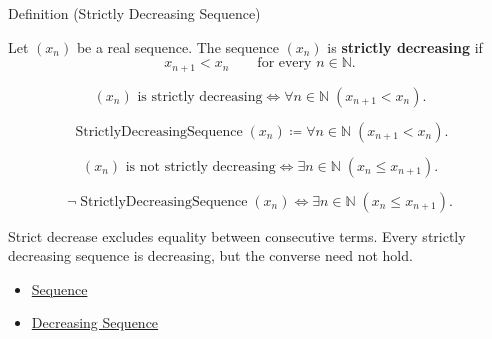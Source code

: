 
\begin{definitionbox}{Definition (Strictly Decreasing Sequence)}
\begin{definition}
\label{def:strictly-decreasing-sequence}
Let $(x_n)$ be a real sequence. The sequence $(x_n)$ is
\textbf{strictly decreasing} if
\[
  x_{n+1} < x_n
  \qquad
  \text{for every } n\in\mathbb{N}.
\]
\end{definition}
\end{definitionbox}

\begin{remark*}
\[
(x_n)\text{ is strictly decreasing}
\Longleftrightarrow
\forall n\in\mathbb{N}\;(x_{n+1}<x_n).
\]
\end{remark*}

\begin{remark*}
\[
\operatorname{StrictlyDecreasingSequence}(x_n)
\coloneqq
\forall n\in\mathbb{N}\;(x_{n+1}<x_n).
\]
\end{remark*}

\begin{remark*}
\[
(x_n)\text{ is not strictly decreasing}
\Longleftrightarrow
\exists n\in\mathbb{N}\;(x_n\le x_{n+1}).
\]
\end{remark*}

\begin{remark*}
\[
\neg\operatorname{StrictlyDecreasingSequence}(x_n)
\Longleftrightarrow
\exists n\in\mathbb{N}\;(x_n\le x_{n+1}).
\]
\end{remark*}

\begin{remark*}[Interpretation]
Strict decrease excludes equality between consecutive terms. Every strictly
decreasing sequence is decreasing, but the converse need not hold.
\end{remark*}

\begin{dependencies}
\begin{itemize}
  \item \hyperref[def:sequence]{Sequence}
  \item \hyperref[def:decreasing-sequence]{Decreasing Sequence}
\end{itemize}
\end{dependencies}

